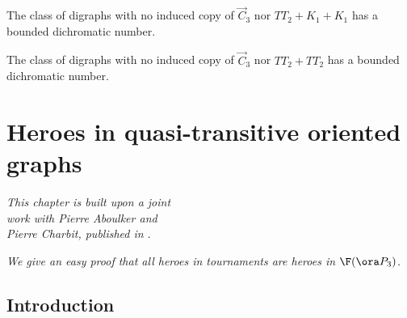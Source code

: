\begin{conjecture}
    The class of digraphs with no induced copy of $\vec C_3$ nor $TT_2 + K_1 + K_1$ has a bounded dichromatic number.
\end{conjecture}

\begin{conjecture}
    The class of digraphs with no induced copy of $\vec C_3$ nor $TT_2 + TT_2$ has a bounded dichromatic number.
\end{conjecture}






\chapter{Heroes in quasi-transitive oriented graphs}\label{chpt:quasi_transitive}

\begin{flushright}{\slshape    
This chapter is built upon a joint \\
work with Pierre Aboulker and \\
Pierre Charbit, published in \cite{AACmulti}}. \\ \medskip
\end{flushright}

\emph{We give an easy proof that all heroes in tournaments are heroes in $\F( \ora P_3)$.} 

\section{Introduction}

